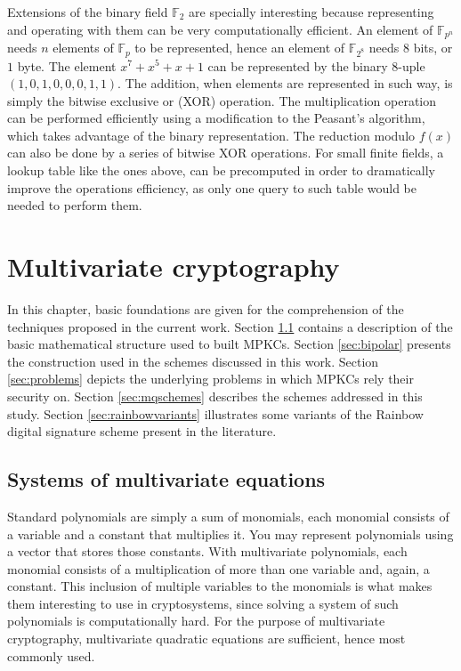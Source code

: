 \documentclass{ufsctex/ufsctex}
\begin{document}
Extensions of the binary field $\mathbb{F}_2$ are specially interesting because
representing and operating with them can be very computationally efficient. An
element of $\mathbb{F}_{p^n}$ needs $n$ elements of $\mathbb{F}_p$ to be
represented, hence an element of $\mathbb{F}_{2^8}$ needs $8$ bits, or $1$
byte. The element $x^7 + x^5 + x + 1$ can be represented by the binary $8$-uple
$(1, 0, 1, 0, 0, 0, 1, 1)$. The addition, when elements are represented in such
way, is simply the bitwise exclusive or (XOR) operation. The multiplication
operation can be performed efficiently using a modification to the Peasant's
algorithm, which takes advantage of the binary representation. The reduction
modulo $f(x)$ can also be done by a series of bitwise XOR operations. For small
finite fields, a lookup table like the ones above, can be precomputed in order
to dramatically improve the operations efficiency, as only one query to such
table would be needed to perform them.

\chapter{Multivariate cryptography}

In this chapter, basic foundations are given for the comprehension of the
techniques proposed in the current work. Section \ref{sec:mqsystems} contains a
description of the basic mathematical structure used to built MPKCs. Section
\ref{sec:bipolar} presents the construction used in the schemes discussed in
this work. Section \ref{sec:problems} depicts the underlying problems in which
MPKCs rely their security on. Section \ref{sec:mqschemes} describes the schemes
addressed in this study. Section \ref{sec:rainbowvariants} illustrates some
variants of the Rainbow digital signature scheme present in the literature.

\section{Systems of multivariate equations}\label{sec:mqsystems}

Standard polynomials are simply a sum of monomials, each monomial consists of a
variable and a constant that multiplies it. You may represent polynomials using
a vector that stores those constants. With multivariate polynomials, each
monomial consists of a multiplication of more than one variable and, again, a
constant. This inclusion of multiple variables to the monomials is what makes
them interesting to use in cryptosystems, since solving a system of such
polynomials is computationally hard. For the purpose of multivariate
cryptography, multivariate quadratic equations are sufficient, hence most
commonly used.
\end{document}
